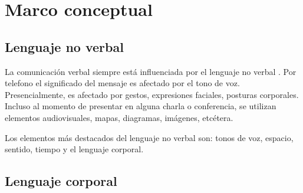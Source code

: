 \chapter{Marco conceptual}

\section{Lenguaje no verbal}
La comunicación verbal siempre está influenciada por el lenguaje no verbal \cite{bussinessCommunication}. Por telefono el significado del mensaje es afectado por el tono de voz. Presencialmente, es afectado por gestos, expresiones faciales, posturas corporales. Incluso al momento de presentar en alguna charla o conferencia, se utilizan elementos audiovisuales, mapas, diagramas, imágenes, etcétera.

Los elementos más destacados del lenguaje no verbal son: tonos de voz, espacio, sentido, tiempo y el lenguaje corporal.

\section{Lenguaje corporal}






